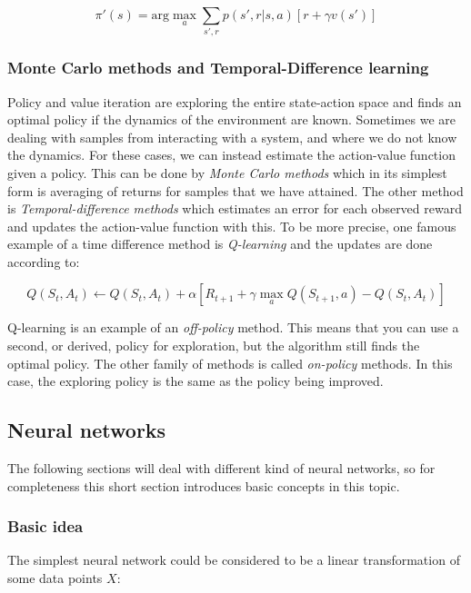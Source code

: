 \begin{equation}
    \pi'(s) = \text{arg}\max_a \sum_{s', r} p(s', r|s, a) \left[r + \gamma v(s')\right]
\end{equation}

\subsubsection{Monte Carlo methods and Temporal-Difference learning}

Policy and value iteration are exploring the entire state-action space and
finds an optimal policy if the dynamics of the environment are known. Sometimes
we are dealing with samples from interacting with a system, and where we do not
know the dynamics. For these cases, we can instead estimate the action-value
function given a policy. This can be done by \textit{Monte Carlo methods} which
in its simplest form is averaging of returns for samples that we have attained.
The other method is \textit{Temporal-difference methods} which estimates an error
for each observed reward and updates the action-value function with this. To be
more precise, one famous example of a time difference method is
\textit{Q-learning} and the updates are done according to:

\begin{equation}
    Q(S_t, A_t) \leftarrow Q(S_t, A_t) + \alpha \left[ R_{t+1} + \gamma \max_a Q(S_{t+1}, a) - Q(S_t, A_t) \right]
\end{equation}

Q-learning is an example of an \textit{off-policy} method. This means that you
can use a second, or derived, policy for exploration, but the algorithm still
finds the optimal policy. The other family of methods is called
\textit{on-policy} methods. In this case, the exploring policy is the
same as the policy being improved.

\subsection{Neural networks}

The following sections will deal with different kind of neural networks, so
for completeness this short section introduces basic concepts in this topic.

\subsubsection{Basic idea}

The simplest neural network could be considered to be a linear transformation
of some data points $X$:

